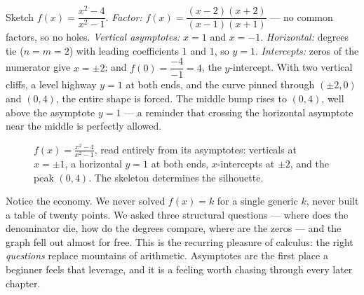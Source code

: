 \begin{example}
\label{ch09:ex-full}
Sketch $f(x)=\dfrac{x^2-4}{x^2-1}$.
\emph{Factor:} $f(x)=\dfrac{(x-2)(x+2)}{(x-1)(x+1)}$ --- no common factors, so no
holes. \emph{Vertical asymptotes:} $x=1$ and $x=-1$. \emph{Horizontal:} degrees
tie ($n=m=2$) with leading coefficients $1$ and $1$, so $y=1$. \emph{Intercepts:}
zeros of the numerator give $x=\pm 2$; and $f(0)=\dfrac{-4}{-1}=4$, the
$y$-intercept. With two vertical cliffs, a level highway $y=1$ at both ends, and
the curve pinned through $(\pm2,0)$ and $(0,4)$, the entire shape is forced. The
middle bump rises to $(0,4)$, well above the asymptote $y=1$ --- a reminder that
crossing the horizontal asymptote near the middle is perfectly allowed.
\end{example}

\begin{figure}[H]
\centering
{}
\caption{$f(x)=\frac{x^2-4}{x^2-1}$, read entirely from its asymptotes:
verticals at $x=\pm1$, a horizontal $y=1$ at both ends, $x$-intercepts at
$\pm2$, and the peak $(0,4)$. The skeleton determines the silhouette.}
\label{ch09:fig-full}
\end{figure}

\begin{aestheticbox}
Notice the economy. We never solved $f(x)=k$ for a single generic $k$, never
built a table of twenty points. We asked three structural questions --- where
does the denominator die, how do the degrees compare, where are the zeros --- and
the graph fell out almost for free. This is the recurring pleasure of calculus:
the right \emph{questions} replace mountains of arithmetic. Asymptotes are the
first place a beginner feels that leverage, and it is a feeling worth chasing
through every later chapter.
\end{aestheticbox}

